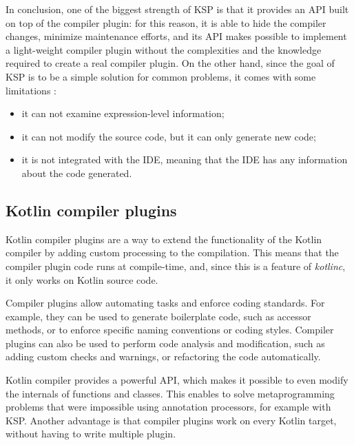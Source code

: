 In conclusion, one of the biggest strength of KSP is that it provides an API built on top of the compiler plugin: for this reason, it is able to hide the compiler changes, minimize maintenance efforts, and its API makes possible to implement a light-weight compiler plugin without the complexities and the knowledge required to create a real compiler plugin.\newline
On the other hand, since the goal of KSP is to be a simple solution for common problems, it comes with some limitations \cite{ksp_limitations}:
\begin{itemize}
    \item it can not examine expression-level information;
    \item it can not modify the source code, but it can only generate new code;
    \item it is not integrated with the IDE, meaning that the IDE has any information about the code generated.
\end{itemize}

\subsection{Kotlin compiler plugins}\label{section:compiler_plugin_explanation}
Kotlin compiler plugins \cite{compiler_plugins_jetbrains} are a way to extend the functionality of the Kotlin compiler by adding custom processing to the compilation. This means that the compiler plugin code runs at compile-time, and, since this is a feature of \textit{kotlinc}, it only works on Kotlin source code.

Compiler plugins allow automating tasks and enforce coding standards. For example, they can be used to generate boilerplate code, such as accessor methods, or to enforce specific naming conventions or coding styles. Compiler plugins can also be used to perform code analysis and modification, such as adding custom checks and warnings, or refactoring the code automatically.

Kotlin compiler provides a powerful API, which makes it possible to even modify the internals of functions and classes. This enables to solve metaprogramming problems that were impossible using annotation processors, for example with KSP. Another advantage is that compiler plugins work on every Kotlin target, without having to write multiple plugin.

